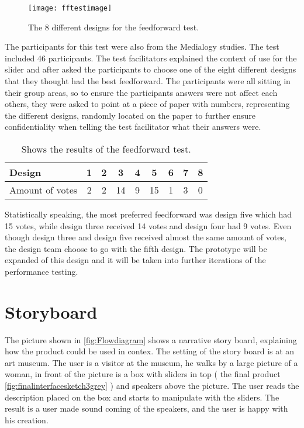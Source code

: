 \begin{figure}[!h] 
\centering
\texttt{[image: fftestimage]}
\caption{\label{fig:fftestimage} The 8 different designs for the feedforward test.}
\end{figure}

The participants for this test were also from the Medialogy studies. The test included 46 participants. The test facilitators explained the context of use for the slider and after asked the participants to choose one of the eight different designs that they thought had the best feedforward. The participants were all sitting in their group areas, so to ensure the participants answers were not affect each others, they were asked to point at a piece of paper with numbers, representing the different designs, randomly located on the paper to further ensure confidentiality when telling the test facilitator what their answers were. 

\begin{table}[!h]
\centering
\caption{Shows the results of the feedforward test.\label{tab:sliderresults}}
\begin{tabular}{|l|c|c|c|c|c|c|c|c|}
\hline
Design & 1 & 2 & 3 & 4 & 5 & 6 & 7 & 8 \\ \hline
Amount of votes & 2 & 2 & 14 & 9 & 15 & 1 & 3 & 0 \\ \hline
\end{tabular}
\end{table}

Statistically speaking, the most preferred feedforward was design five which had 15 votes, while design three received 14 votes and design four had 9 votes.
Even though design three and design five received almost the same amount of votes, the design team choose to go with the fifth design. The prototype will be expanded of this design and it will be taken into further iterations of the performance testing. 

\section{Storyboard}\label{sec:storyboard}
The picture shown in \ref{fig:Flowdiagram} shows a narrative story board, explaining how the product could be used in contex. The setting of the story board is at an art museum. The user is a visitor at the museum, he walks by a large picture of a woman, in front of the picture is a box with sliders in top ( the final product \ref{fig:finalinterfacesketch3grey} ) and speakers above the picture. The user reads the description placed on the box and starts to manipulate with the sliders. The result is a user made sound coming of the speakers, and the user is happy with his creation. 

